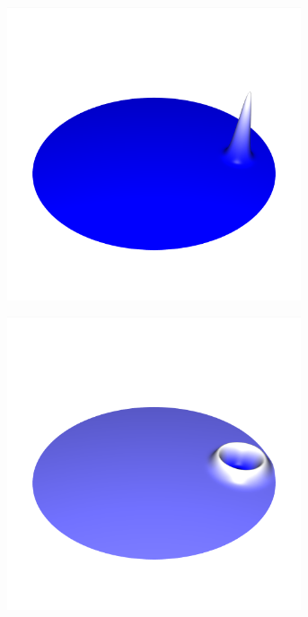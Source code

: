 \documentclass[crop=false,10pt,ngerman]{standalone}
\begin{document}
      \begin{figure}[p]
        \center
        \begin{subfigure}[b]{0.24\textwidth}
          \center
          \includegraphics[trim={1.5cm 3.05cm 1.5cm 5.2cm},clip,width=0.95\textwidth]{images/circle_wave_0.png}
          \caption{}
        \end{subfigure}
        \begin{subfigure}[b]{0.24\textwidth}
          \center
          \includegraphics[trim={1.5cm 3.05cm 1.5cm 5.2cm},clip,width=0.95\textwidth]{images/circle_wave_1.png}

\end{subfigure}
\end{figure}
\end{document}
